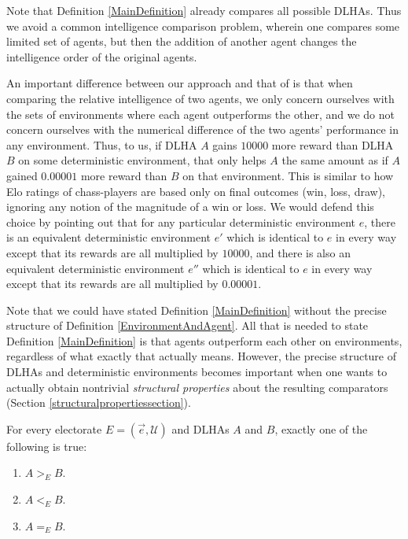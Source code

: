 \documentclass[twoside,11pt]{article}
\begin{document}
Note that Definition \ref{MainDefinition} already compares all possible DLHAs.
Thus we avoid a common intelligence comparison problem, wherein one compares some
limited set of agents, but then the addition of another agent changes the
intelligence order of the original agents.

An important difference between our approach and that of \citet{hutter2007}
is that when comparing the relative intelligence of two agents, we only concern ourselves
with the sets of environments where each agent outperforms the other, and we do not
concern ourselves with the numerical difference of the two agents' performance in any
environment. Thus, to us, if DLHA $A$ gains $10000$ more reward than DLHA $B$ on some
deterministic environment, that only helps $A$ the same amount as
if $A$ gained $0.00001$ more reward
than $B$ on that environment.
This is similar to how Elo ratings of chass-players
are based only on final outcomes (win, loss, draw),
ignoring any notion of the magnitude of a win or loss.
We would defend this choice by pointing out that for any
particular deterministic environment $e$, there is an
equivalent deterministic environment $e'$ which is identical to
$e$ in every way except that its rewards are all multiplied by $10000$, and there is also
an equivalent deterministic environment $e''$ which is
identical to $e$ in every way except that its
rewards are all multiplied by $0.00001$.

Note that we could have stated Definition \ref{MainDefinition} without the
precise structure of Definition \ref{EnvironmentAndAgent}.
All that is needed to state Definition \ref{MainDefinition} is that agents
outperform each other on environments, regardless of what exactly that actually means.
However, the precise structure of DLHAs and deterministic environments becomes
important when one
wants to actually obtain nontrivial \emph{structural properties} about the resulting
comparators (Section \ref{structuralpropertiessection}).

\begin{lemma}
\label{firsteasylemma}
    For every electorate $E=(\vec{e},\mathscr U)$ and DLHAs $A$ and $B$, exactly one of the following is true:
    \begin{enumerate}
        \item $A>_{E}B$.
        \item $A<_{E}B$.
        \item $A=_{E}B$.
    \end{enumerate}
\end{lemma}
\end{document}
